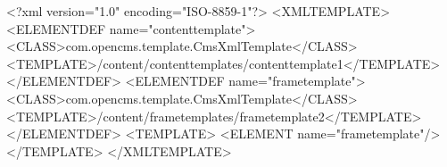 <?xml version="1.0" encoding="ISO-8859-1"?> 
<XMLTEMPLATE>
    <ELEMENTDEF name="contenttemplate">
        <CLASS>com.opencms.template.CmsXmlTemplate</CLASS>
        <TEMPLATE>/content/contenttemplates/contenttemplate1</TEMPLATE>
    </ELEMENTDEF>
    <ELEMENTDEF name="frametemplate">
        <CLASS>com.opencms.template.CmsXmlTemplate</CLASS>
        <TEMPLATE>/content/frametemplates/frametemplate2</TEMPLATE>
    </ELEMENTDEF>
<TEMPLATE> <ELEMENT name="frametemplate"/> </TEMPLATE>
</XMLTEMPLATE>
